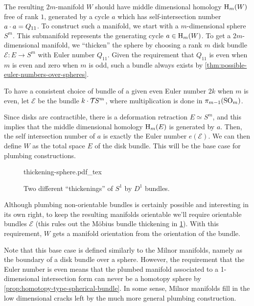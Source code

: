 The resulting $2m$-manifold $W$ should have middle dimensional homology $\operatorname{H}_m(W)$ free of rank $1$, generated by a cycle $a$ which has self-intersection number $a \cdot a= Q_{11}$. To construct such a manifold, we start with a $m$-dimensional sphere $S^m$. This submanifold represents the generating cycle $a\in \operatorname{H}_m(W)$.
To get a $2m$-dimensional manifold, we ``thicken'' the sphere by choosing a rank $m$ disk bundle $\mathcal{E} : E \to S^m$ with Euler number $Q_{11}$. Given the requirement that $Q_{11}$ is even when $m$ is even and zero when $m$ is odd, such a bundle always exists by \cref{thm:possible-euler-numbers-over-spheres}.
\begin{remark*}
	To have a consistent choice of bundle of a given even Euler number $2k$ when $m$ is even, let $\mathcal{E}$ be the bundle $k\cdot {\mathcal{T}\hspace{-0.1em}} S^m$, where multiplication is done in $\pi_{m-1}(\mathrm{SO}_m)$.
\end{remark*}
Since disks are contractible, there is a deformation retraction $E\simeq S^m$, and this implies that the middle dimensional homology $\operatorname{H}_m(E)$ is generated by $a$.
Then, the self intersection number of $a$ is exactly the Euler number $e(\mathcal{E})$.
We can then define $W$ as the total space $E$ of the disk bundle. This will be the base case for plumbing constructions.
\begin{figure}[ht]
	\centering
	{thickening-sphere.pdf_tex}
	\caption{Two different ``thickenings'' of $S^1$ by $D^1$ bundles.}\label{fig:thickening-sphere}
\end{figure}
\begin{remark*}
	Although plumbing non-orientable bundles is certainly possible and interesting in its own right, to keep the resulting manifolds orientable we'll require orientable bundles $\mathcal{E}$ (this rules out the M\"obius bundle thickening in \cref{fig:thickening-sphere}). With this requirement, $W$ gets a manifold orientation from the orientation of the bundle.
\end{remark*}

\begin{remark*}
	Note that this base case is defined similarly to the Milnor manifolds, namely as the boundary of a disk bundle over a sphere. However, the requirement that the Euler number is even means that the plumbed manifold associated to a 1-dimensional intersection form can never be a homotopy sphere by \cref{prop:homotopy-type-spherical-bundle}. In some sense, Milnor manifolds fill in the low dimensional cracks left by the much more general plumbing construction.
\end{remark*}
